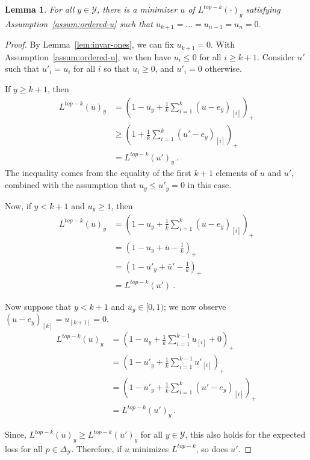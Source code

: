 \documentclass[12pt]{article}
\newcommand{\simplex}{\Delta_\Y}
\newcommand{\Y}{\mathcal{Y}}
\newtheorem{lemma}{Lemma}
\begin{document}
\begin{lemma}\label{lem:extra-elts-zero}
	For all $y \in \Y$, there is a minimizer $u$ of $L^{top-k}(\cdot)_y$ satisfying Assumption~\ref{assum:ordered-u} such that $u_{k+1} = \ldots = u_{n-1} = u_n = 0$.
\end{lemma}
\begin{proof}
	By Lemma~\ref{lem:invar-ones}, we can fix $u_{k+1} = 0$.
	With Assumption~\ref{assum:ordered-u}, we then have $u_i \leq 0$ for all $i \geq k+1$.
	Consider $u'$ such that $u'_i = u_i$ for all $i$ so that $u_i \geq 0$, and $u'_i = 0$ otherwise.
	
	If $y \geq k+1$, then 
	\begin{align*}
	L^{top-k}(u)_y &= (1 - u_y + \frac 1 k \sum_{i=1}^k (u - e_y)_{[i]})_+ \\
	&\geq \left(1 + \frac {1}{k} \sum_{i=1}^k (u' - e_y)_{[i]}\right)_+\\
	&= L^{top-k}(u')_y~.~
	\end{align*}
	The inequality comes from the equality of the first $k+1$ elements of $u$ and $u'$, combined with the assumption that $u_y \leq u'_y = 0$ in this case.
	
	Now, if $y < k+1$ and $u_y \geq 1$, then 
	\begin{align*}
	L^{top-k}(u)_y &= \left(1 - u_y + \frac 1 k \sum_{i=1}^k (u - e_y)_{[i]}\right)_+ \\
	&= \left(1 - u_y + \bar u - \frac 1 k\right)_+\\
	&= \left(1 - u'_y + \bar u' - \frac 1 k\right)_+\\
	&= L^{top-k}(u')~.~
	\end{align*}
	
	Now suppose that $y < k+1$ and $u_y \in [0,1)$; we now observe $(u - e_y)_{[k]} = u_{[k+1]} = 0$. 
	\begin{align*}
	L^{top-k}(u)_y &= \left(1 - u_y + \frac 1 k \sum_{i=1}^{k-1} u_{[i]} + 0 \right)_+\\
	&= \left(1 - u'_y + \frac 1 k \sum_{i=1}^{k-1} u'_{[i]}\right)_+\\
	&= \left(1 - u'_y + \frac 1 k \sum_{i=1}^{k} (u' - e_y)_{[i]}\right)_+\\
	&= L^{top-k}(u')_y~.~
	\end{align*}

	Since, $L^{top-k}(u)_y \geq L^{top-k}(u')_y$ for all $y \in \Y$, this also holds for the expected loss for all $p \in \simplex$.
	Therefore, if $u$ minimizes $L^{top-k}$, so does $u'$.
\end{proof}
\end{document}
